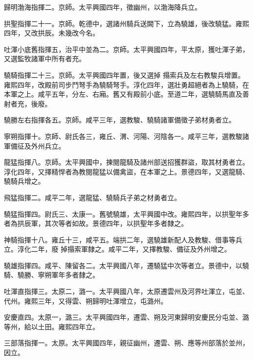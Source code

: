 \begin{pinyinscope}
 歸明渤海指揮二。京師。太平興國四年，徵幽州，以渤海降兵立。



 拱聖指揮二十一。京師。乾德中，選諸州騎兵送闕下，立為驍雄，後改驍猛。雍熙四年，又改拱辰。未幾改今名。



 吐渾小底舊指揮五，治平中並為二。京師。太平興國四年，平太原，獲吐渾子弟，又選監牧諸軍中所有者充。



 驍騎指揮二十三。京師。太平興國四年置，後又選掉
 搨索兵及左右教駿兵增置。雍熙四年，改殿前司步鬥弩手為驍騎弩手。淳化四年，選壯勇超絕者為上驍騎，在本軍之上。咸平五年，分左、右廂。舊又有殿前小底。至道二年，選驍騎馬直及善射者充，後廢。



 驍勝左右指揮各五。京師。咸平三年，選教駿、驍騎諸軍備徵子弟材勇者立。



 寧朔指揮十。京師、尉氏各三，雍丘、渭、河陽、河陰各一。咸平三年，選教駿諸軍備征及外州兵立。



 龍猛指揮八。京師。太平興國中，揀閱龍騎及諸州部送招獲群盜，取其材勇者立。淳化四年，又擇精悍者為教閱龍猛以備禽盜，在本軍之上。景德四年，又選龍騎、驍騎兵增之。



 飛猛指揮二。咸平二年，選龍猛、驍騎兵子弟之材勇者立。



 驍猛指揮四。尉氏三、太康一。舊號驍雄，太平興國中改。雍熙四年，以拱聖年多者為拱辰軍，其次等者如故。景德四年，以拱聖年多者隸之。



 神騎指揮十八。雍丘十三，咸平五。端拱二年，選驍雄新配人及教駿、借事等兵立。淳化二年，廢
 掉搨索軍隸之。咸平二年，又擇教駿、備征及外州增之。



 驍雄指揮四。咸平、陳留各二。太平興國八年，遷驍猛中次等者立。景德中，以驍騎、驍勝、寧朔軍年多者隸之。



 吐渾直指揮三。太原二，潞一。太平興國八年，太原遷雲州及河界吐渾立，屯並、代州。雍熙三年，又得雲、朔歸明吐渾增立，屯潞州。



 安慶直四。太原一，潞三。太平興國四年，遷雲、朔及河東歸明安慶民分屯並、潞等州，給以土田。雍熙四年立。



 三部落指揮一。太原。太平興國四年，親征幽州，遷雲、朔、應等州部落於並州，因立。




\end{pinyinscope}
